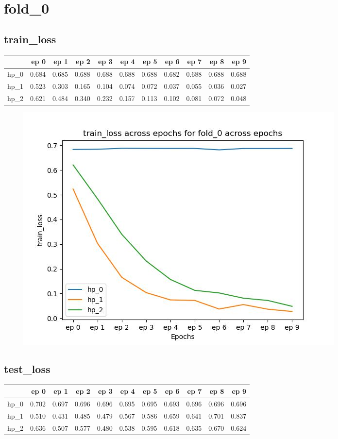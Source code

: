 \documentclass{article}
\begin{document}
\section{fold\_0}
\subsection{train\_loss}
\begin{tabular}{lrrrrrrrrrr}
\toprule
{} &   ep 0 &   ep 1 &   ep 2 &   ep 3 &   ep 4 &   ep 5 &   ep 6 &   ep 7 &   ep 8 &   ep 9 \\
\midrule
hp\_0 &  0.684 &  0.685 &  0.688 &  0.688 &  0.688 &  0.688 &  0.682 &  0.688 &  0.688 &  0.688 \\
hp\_1 &  0.523 &  0.303 &  0.165 &  0.104 &  0.074 &  0.072 &  0.037 &  0.055 &  0.036 &  0.027 \\
hp\_2 &  0.621 &  0.484 &  0.340 &  0.232 &  0.157 &  0.113 &  0.102 &  0.081 &  0.072 &  0.048 \\
\bottomrule
\end{tabular}

\begin{figure}[H]
\includegraphics[scale = 0.75]{fold_0/train_loss}
\end{figure}
\subsection{test\_loss}
\begin{tabular}{lrrrrrrrrrr}
\toprule
{} &   ep 0 &   ep 1 &   ep 2 &   ep 3 &   ep 4 &   ep 5 &   ep 6 &   ep 7 &   ep 8 &   ep 9 \\
\midrule
hp\_0 &  0.702 &  0.697 &  0.696 &  0.696 &  0.695 &  0.695 &  0.693 &  0.696 &  0.696 &  0.696 \\
hp\_1 &  0.510 &  0.431 &  0.485 &  0.479 &  0.567 &  0.586 &  0.659 &  0.641 &  0.701 &  0.837 \\
hp\_2 &  0.636 &  0.507 &  0.577 &  0.480 &  0.538 &  0.595 &  0.618 &  0.635 &  0.670 &  0.624 \\
\bottomrule
\end{tabular}
\end{document}
